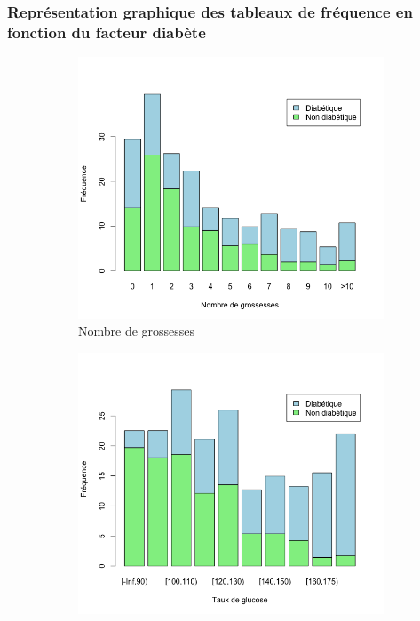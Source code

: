 \documentclass[a4paper,11pt]{report}
\begin{document}
\subsubsection{Représentation graphique des tableaux de fréquence en fonction du facteur diabète}


\begin{figure}[H]
	\centering
	\captionsetup{justification=centering, margin=2cm}
	\begin{subfigure}[b]{0.25\linewidth}
		\centering
		\captionsetup{justification=centering}
		\includegraphics[width=1\linewidth]{img/1-3-2-barplot-freq-diabete-grossesses}
		\caption{\scriptsize Nombre de grossesses}
		\label{fig:1-3-2-barplot-freq-diabete-grossesses}
	\end{subfigure}%
	\begin{subfigure}[b]{0.25\linewidth}
		\centering
		\captionsetup{justification=centering}
		\includegraphics[width=1\linewidth]{img/1-3-2-barplot-freq-diabete-glucose}

\end{subfigure}
\end{figure}
\end{document}
